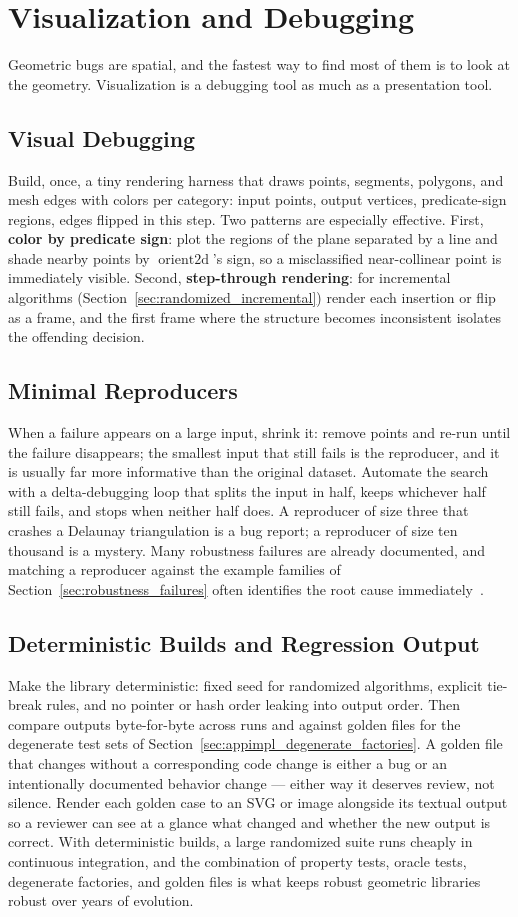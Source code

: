 \section{Visualization and Debugging}
\label{sec:app_impl_visualization}
Geometric bugs are spatial, and the fastest way to find most of them is to
look at the geometry. Visualization is a debugging tool as much as a
presentation tool.
\subsection{Visual Debugging}
\label{sec:appimpl_visual}
Build, once, a tiny rendering harness that draws points, segments, polygons,
and mesh edges with colors per category: input points, output vertices,
predicate-sign regions, edges flipped in this step. Two patterns are
especially effective. First, \textbf{color by predicate sign}: plot the
regions of the plane separated by a line and shade nearby points by
$\operatorname{orient2d}$'s sign, so a misclassified near-collinear point is
immediately visible. Second, \textbf{step-through rendering}: for
incremental algorithms (Section~\ref{sec:randomized_incremental}) render
each insertion or flip as a frame, and the first frame where the structure
becomes inconsistent isolates the offending decision.
\subsection{Minimal Reproducers}
\label{sec:appimpl_reproducers}
When a failure appears on a large input, shrink it: remove points and
re-run until the failure disappears; the smallest input that still fails is
the reproducer, and it is usually far more informative than the original
dataset. Automate the search with a delta-debugging loop that splits the
input in half, keeps whichever half still fails, and stops when neither half
does. A reproducer of size three that crashes a Delaunay triangulation is a
bug report; a reproducer of size ten thousand is a mystery. Many robustness
failures are already documented, and matching a reproducer against the
example families of Section~\ref{sec:robustness_failures} often identifies
the root cause immediately~\cite{kettner2008}.
\subsection{Deterministic Builds and Regression Output}
\label{sec:appimpl_regression}
Make the library deterministic: fixed seed for randomized algorithms,
explicit tie-break rules, and no pointer or hash order leaking into output
order. Then compare outputs byte-for-byte across runs and against golden
files for the degenerate test sets of
Section~\ref{sec:appimpl_degenerate_factories}. A golden file that changes
without a corresponding code change is either a bug or an intentionally
documented behavior change --- either way it deserves review, not silence.
Render each golden case to an SVG or image alongside its textual output so
a reviewer can see at a glance what changed and whether the new output is
correct. With deterministic builds, a large randomized suite runs cheaply in
continuous integration, and the combination of property tests, oracle tests,
degenerate factories, and golden files is what keeps robust geometric
libraries robust over years of evolution.
